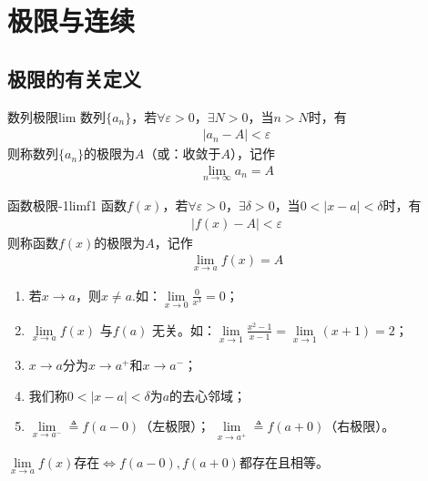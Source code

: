 \chapter{极限与连续}
\section{极限的有关定义}
\begin{definition}{数列极限}{lim}
数列$\{a_n\}$，若$ \forall\varepsilon>0 $，$ \exists N>0 $，当$ n>N $时，有
\begin{align}
    \vert{a_n-A}\vert<\varepsilon
\end{align}
则称数列$\{a_n\}$的极限为$A$（或：收敛于$A$），记作
\begin{align}
    \lim_{n\to \infty} a_n=A 
\end{align}
\end{definition}



\begin{definition}{函数极限-1}{limf1}
函数$f(x)$，若$ \forall\varepsilon>0 $，$ \exists \delta>0 $，当$ 0<\vert x-a\vert <\delta $时，有
\begin{align}
    \vert{f(x)-A}\vert<\varepsilon
\end{align}
则称函数$f(x)$的极限为$A$，记作
\begin{align}
    \lim_{x\to a} f(x)=A
\end{align}
\end{definition}

\begin{note}
\begin{enumerate}
    \item 若$x \to a$，则$x\neq a$.如：$ \lim\limits_{x\to 0}\displaystyle\frac{0}{x^3}=0 $；
    \item $\lim\limits_{x \to a}f(x)$ 与$ f(a) $ 无关。如：$\lim\limits_{x \to 1}\displaystyle\frac{x^2-1}{x-1}=\lim\limits_{x \to 1}(x+1)=2$；
    \item $x \to a$分为$ x \to a^{+} $和$ x \to a^{-}$；
    \item 我们称$0<\vert x-a\vert <\delta$为$ a $的去心邻域；
    \item $\lim\limits_{x \to a^-}\triangleq f(a-0)$（左极限）；
    $\lim\limits_{x \to a^+}\triangleq f(a+0)$（右极限）。
\end{enumerate}
\end{note}

\FiveStar $\lim\limits_{x \to a} f(x)$存在$\iff f(a-0),f(a+0)$都存在且相等。


